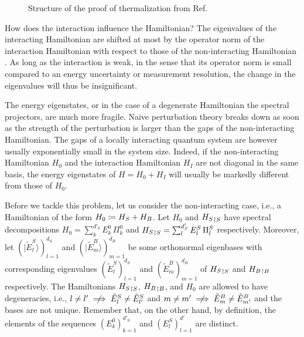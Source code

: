 \documentclass[a4paper,12pt,listof=totoc,index=totoc,bibliography=totoc,headsepline=false,headings=normal,BCOR16.153846mm,DIV12,headinclude,twoside,cleardoublepage=empty,numbers=noenddot,final]{scrreprt}
\theoremstyle{mystyle}
\numberwithin{equation}{section}
\numberwithin{figure}{section}
\numberwithin{lemma}{section}
\numberwithin{theorem}{section}
\numberwithin{corollary}{section}
\numberwithin{definition}{section}
\numberwithin{conjecture}{section}
\numberwithin{observation}{section}
\newenvironment{block}[1]{%
\begin{lrbox}{\blocksavebox}%
\begin{minipage}%
{\linewidth}%
}{%
\end{minipage}\end{lrbox}%
\usebox{\blocksavebox}
}
\newcommand{\+}{\mkern2mu}
\newcommand{\coloneqq}{\mathrel{\vcentcolon\mkern-1.2mu=}} %
\renewcommand{\H}{H}
\newcommand{\ket}[1]{|#1\rangle}
\newcommand{\notimplies}{\centernot\implies}
\newcommand{\trunc}[2]{{#1}_{\upharpoonright \mathnormal{#2}}}
\DeclareMathOperator{\1}{\mathds{1}}
\begin{document}
\begin{figure}[bt]
  \caption{Structure of the proof of thermalization from Ref.~\cite{Riera2012}}
  \label{fig:structureofthermalizationargument}
\end{figure}

How does the interaction influence the Hamiltonian?
The eigenvalues of the interacting Hamiltonian are shifted at most by the operator norm of the interaction Hamiltonian with respect to those of the non-interacting Hamiltonian \cite[Theorem III.2.1]{bhatia}.
As long as the interaction is weak, in the sense that its operator norm is small compared to an energy uncertainty or measurement resolution, the change in the eigenvalues will thus be insignificant.

The energy eigenstates, or in the case of a degenerate Hamiltonian the spectral projectors, are much more fragile.
Naive perturbation theory breaks down \cite{Sakurai1995} as soon as the strength of the perturbation is larger than the gaps of the non-interacting Hamiltonian.
The gaps of a locally interacting quantum system are however usually exponentially small in the system size.
Indeed, if the non-interacting Hamiltonian $\H_0$ and the interaction Hamiltonian $\H_I$ are not diagonal in the same basis, the energy eigenstates of $\H = \H_0 + \H_I$ will usually be markedly different from those of $\H_0$.

Before we tackle this problem, let us consider the non-interacting case, i.e., a Hamiltonian of the form $\H_0 \coloneqq \H_S + \H_B$.
Let $\H_0$ and $\trunc {\H_S} S$ have spectral decompositions $\H_0 = \sum_k^{d'_0} E^0_k\,\Pi^0_k$ and $\trunc {\H_S} S = \sum_l^{d_S'} E^S_l\,\Pi^S_l$ respectively.
Moreover, let $(\ket{\tilde E^S_l})_{l=1}^{d_S}$ and $(\ket{\tilde E^B_m})_{m=1}^{d_B}$ be some orthonormal eigenbases with corresponding eigenvalues $(\tilde E^S_l)_{l=1}^{d_S}$ and $(\tilde E^B_m)_{m=1}^{d_B}$ of $\trunc {\H_S} S$ and $\trunc {\H_B} B$ respectively.
The Hamiltonians $\trunc {H_S} S$, $\trunc {H_B} B$, and $\H_0$ are allowed to have degeneracies, i.e., $l\neq l' \notimplies \tilde E^S_l \neq \tilde E^S_{l'}$ and  $m\neq m' \notimplies \tilde E^B_m \neq  \tilde E^B_{m'}$ and the bases are not unique.
Remember that, on the other hand, by definition, the elements of the sequences $(E^0_k)_{k=1}^{d'_0}$ and $(E^S_l)_{l=1}^{d'}$ are distinct.
\end{document}
